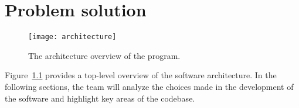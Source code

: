 \chapter{Problem solution}\label{ch:problem-solution}

\begin{figure}[H]
    \centering
    \texttt{[image: architecture]}
    \caption{The architecture overview of the program.}\label{fig:software-architecture}
\end{figure}

Figure~\ref{fig:software-architecture} provides a top-level overview of the software architecture.
In the following sections, the team will analyze the choices made in the development of the software and highlight key
areas of the codebase.





